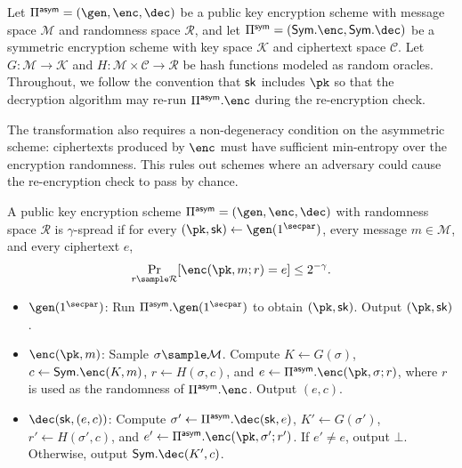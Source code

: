 Let $\Pi^{\mathsf{asym}} = (\gen, \enc, \dec)$ be a public key encryption scheme with message space $\mathcal{M}$ and randomness space $\mathcal{R}$, and let $\Pi^{\mathsf{sym}} = (\mathsf{Sym}.\enc, \mathsf{Sym}.\dec)$ be a symmetric encryption scheme with key space $\mathcal{K}$ and ciphertext space $\mathcal{C}$. Let $G \colon \mathcal{M} \to \mathcal{K}$ and $H \colon \mathcal{M} \times \mathcal{C} \to \mathcal{R}$ be hash functions modeled as random oracles. Throughout, we follow the convention that $\mathsf{sk}$ includes $\pk$ so that the decryption algorithm may re-run $\Pi^{\mathsf{asym}}.\enc$ during the re-encryption check.

The transformation also requires a non-degeneracy condition on the asymmetric scheme: ciphertexts produced by $\enc$ must have sufficient min-entropy over the encryption randomness. This rules out schemes where an adversary could cause the re-encryption check to pass by chance.

\begin{definition}
    A public key encryption scheme $\Pi^{\mathsf{asym}} = (\gen, \enc, \dec)$ with randomness space $\mathcal{R}$ is $\gamma$-spread if for every $(\pk, \sk) \gets \gen(1^\secpar)$, every message $m \in \mathcal{M}$, and every ciphertext $e$,
    \[ \Pr_{r \sample \mathcal{R}}[\enc(\pk, m; r) = e] \leq 2^{-\gamma}. \]
\end{definition}

\begin{construction}
    \hfill
    \begin{itemize}
        \item $\gen(1^\secpar)$: Run $\Pi^{\mathsf{asym}}.\gen(1^\secpar)$ to obtain $(\pk, \sk)$. Output $(\pk, \sk)$.
        \item $\enc(\pk, m)$: Sample $\sigma \sample \mathcal{M}$. Compute $K \gets G(\sigma)$, $c \gets \mathsf{Sym}.\enc(K, m)$, $r \gets H(\sigma, c)$, and $e \gets \Pi^{\mathsf{asym}}.\enc(\pk, \sigma; r)$, where $r$ is used as the randomness of $\Pi^{\mathsf{asym}}.\enc$. Output $(e, c)$.
        \item $\dec(\sk, (e, c))$: Compute $\sigma' \gets \Pi^{\mathsf{asym}}.\dec(\sk, e)$, $K' \gets G(\sigma')$, $r' \gets H(\sigma', c)$, and $e' \gets \Pi^{\mathsf{asym}}.\enc(\pk, \sigma'; r')$. If $e' \neq e$, output $\bot$. Otherwise, output $\mathsf{Sym}.\dec(K', c)$.
    \end{itemize}
\end{construction}

